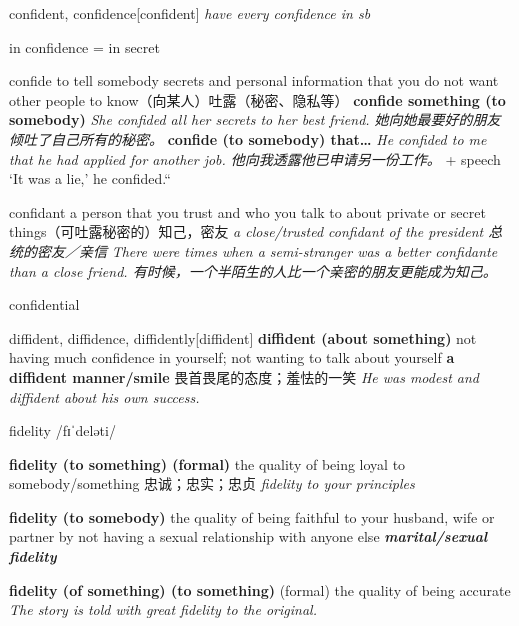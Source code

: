 \begin{DefWord}{confident, confidence}[confident]
    \textit{have every confidence in sb}

    in confidence = in secret
\end{DefWord}

\begin{DefWord}{confide}
    to tell somebody secrets and personal information that you do not want other people to know（向某人）吐露（秘密、隐私等）
    \textbf{ confide something (to somebody)} \textit{She confided all her secrets to her best friend. 她向她最要好的朋友倾吐了自己所有的秘密。}
    \textbf{confide (to somebody) that…} \textit{He confided to me that he had applied for another job. 他向我透露他已申请另一份工作。}
 + speech ‘It was a lie,’ he confided.“
\end{DefWord}

\begin{DefWord}{confidant}
    a person that you trust and who you talk to about private or secret things（可吐露秘密的）知己，密友
    \textit{a close/trusted confidant of the president 总统的密友／亲信}
    \textit{There were times when a semi-stranger was a better confidante than a close friend. 有时候，一个半陌生的人比一个亲密的朋友更能成为知己。}
\end{DefWord}

\begin{DefWord}{confidential}
\end{DefWord}

\begin{DefWord}{diffident, diffidence, diffidently}[diffident]
    \textbf{diffident (about something)} not having much confidence in yourself; not wanting to talk about yourself
    \textbf{a diffident manner/smile} 畏首畏尾的态度；羞怯的一笑
    \textit{He was modest and diffident about his own success.}
\end{DefWord}

\begin{DefWord}{fidelity}
    /fɪˈdeləti/

    \textbf{fidelity (to something) (formal)} the quality of being loyal to somebody/something 忠诚；忠实；忠贞
    \textit{fidelity to your principles}

    \textbf{fidelity (to somebody)} the quality of being faithful to your husband, wife or partner by not having a sexual relationship with anyone else
    \textit{\textbf{marital/sexual fidelity}}

    \textbf{fidelity (of something) (to something)} (formal) the quality of being accurate
    \textit{The story is told with great fidelity to the original.}
\end{DefWord}


